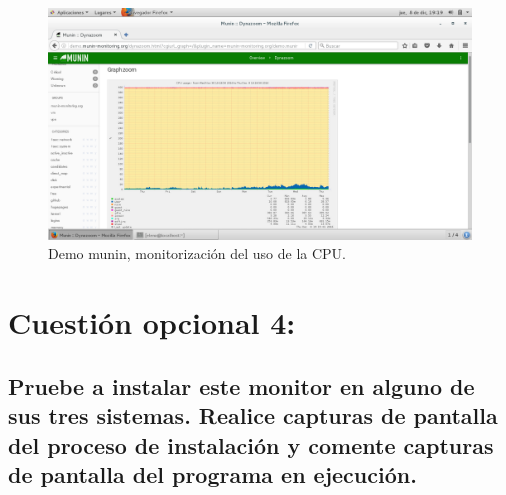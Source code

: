 \begin{figure}[H] 
	\centering
	\includegraphics[width=14.7cm]{./img/ejercicio6_4.png} 	
	\caption{Demo munin, monitorización del uso de la CPU.} \label{fig:ejercicio6_4}
\end{figure}








\section{Cuestión opcional 4:}

\subsection{Pruebe a instalar este monitor en alguno de sus tres sistemas. Realice capturas de pantalla del proceso de instalación y comente capturas de pantalla del programa en ejecución.}

